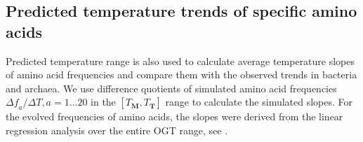 \documentclass[10pt,letterpaper]{article}
\begin{document}
    
    
 \subsection*{Predicted temperature trends of specific amino acids}
    
Predicted temperature range is also used to calculate average temperature slopes of amino acid frequencies and compare them with the observed trends in bacteria and archaea. We use difference quotients of simulated amino acid frequencies $\Delta\mathit{f}_{a}/\Delta T, a=1\dots20$ in the $[T_{\mathbf{M}},T_{\mathbf{T}}]$ range to calculate the simulated slopes. For the evolved frequencies of amino acids, the slopes were derived from the  linear regression analysis over the entire OGT range, see .
\end{document}
